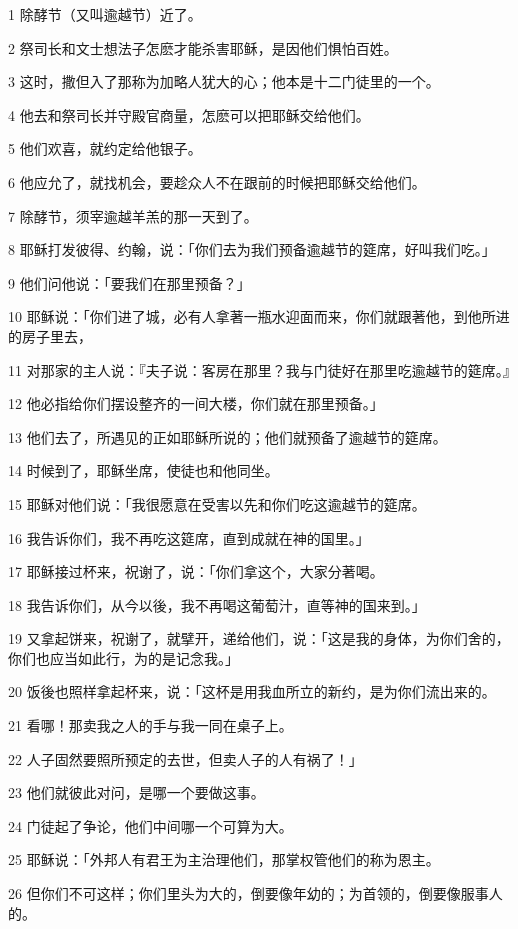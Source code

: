 \par 1 除酵节（又叫逾越节）近了。
\par 2 祭司长和文士想法子怎麽才能杀害耶稣，是因他们惧怕百姓。
\par 3 这时，撒但入了那称为加略人犹大的心；他本是十二门徒里的一个。
\par 4 他去和祭司长并守殿官商量，怎麽可以把耶稣交给他们。
\par 5 他们欢喜，就约定给他银子。
\par 6 他应允了，就找机会，要趁众人不在跟前的时候把耶稣交给他们。
\par 7 除酵节，须宰逾越羊羔的那一天到了。
\par 8 耶稣打发彼得、约翰，说：「你们去为我们预备逾越节的筵席，好叫我们吃。」
\par 9 他们问他说：「要我们在那里预备？」
\par 10 耶稣说：「你们进了城，必有人拿著一瓶水迎面而来，你们就跟著他，到他所进的房子里去，
\par 11 对那家的主人说：『夫子说：客房在那里？我与门徒好在那里吃逾越节的筵席。』
\par 12 他必指给你们摆设整齐的一间大楼，你们就在那里预备。」
\par 13 他们去了，所遇见的正如耶稣所说的；他们就预备了逾越节的筵席。
\par 14 时候到了，耶稣坐席，使徒也和他同坐。
\par 15 耶稣对他们说：「我很愿意在受害以先和你们吃这逾越节的筵席。
\par 16 我告诉你们，我不再吃这筵席，直到成就在神的国里。」
\par 17 耶稣接过杯来，祝谢了，说：「你们拿这个，大家分著喝。
\par 18 我告诉你们，从今以後，我不再喝这葡萄汁，直等神的国来到。」
\par 19 又拿起饼来，祝谢了，就擘开，递给他们，说：「这是我的身体，为你们舍的，你们也应当如此行，为的是记念我。」
\par 20 饭後也照样拿起杯来，说：「这杯是用我血所立的新约，是为你们流出来的。
\par 21 看哪！那卖我之人的手与我一同在桌子上。
\par 22 人子固然要照所预定的去世，但卖人子的人有祸了！」
\par 23 他们就彼此对问，是哪一个要做这事。
\par 24 门徒起了争论，他们中间哪一个可算为大。
\par 25 耶稣说：「外邦人有君王为主治理他们，那掌权管他们的称为恩主。
\par 26 但你们不可这样；你们里头为大的，倒要像年幼的；为首领的，倒要像服事人的。
